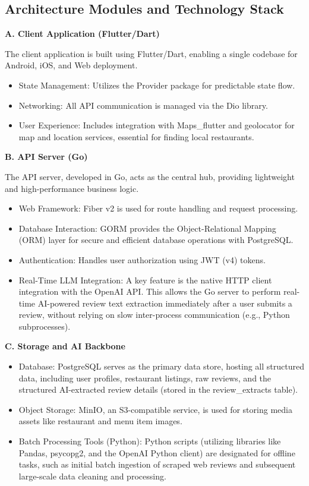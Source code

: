 \subsection{Architecture Modules and Technology Stack}

\textbf{A. Client Application (Flutter/Dart)}

The client application is built using Flutter/Dart, enabling a single codebase for Android, iOS, and Web deployment.

\begin{itemize}
	\item State Management: Utilizes the Provider package for predictable state flow.
	\item Networking: All API communication is managed via the Dio library.
	\item User Experience: Includes integration with Maps\_flutter and geolocator for map and location services, essential for finding local restaurants.
\end{itemize}

\textbf{B. API Server (Go)}

The API server, developed in Go, acts as the central hub, providing lightweight and high-performance business logic.

\begin{itemize}
	\item Web Framework: Fiber v2 is used for route handling and request processing.
	\item Database Interaction: GORM provides the Object-Relational Mapping (ORM) layer for secure and efficient database operations with PostgreSQL.
	\item Authentication: Handles user authorization using JWT (v4) tokens.
	\item Real-Time LLM Integration: A key feature is the native HTTP client integration with the OpenAI API. This allows the Go server to perform real-time AI-powered review text extraction immediately after a user submits a review, without relying on slow inter-process communication (e.g., Python subprocesses).
\end{itemize}

\textbf{C. Storage and AI Backbone}

\begin{itemize}
	\item Database: PostgreSQL serves as the primary data store, hosting all structured data, including user profiles, restaurant listings, raw reviews, and the structured AI-extracted review details (stored in the review\_extracts table).
	\item Object Storage: MinIO, an S3-compatible service, is used for storing media assets like restaurant and menu item images.
	\item Batch Processing Tools (Python): Python scripts (utilizing libraries like Pandas, psycopg2, and the OpenAI Python client) are designated for offline tasks, such as initial batch ingestion of scraped web reviews and subsequent large-scale data cleaning and processing.
\end{itemize}

